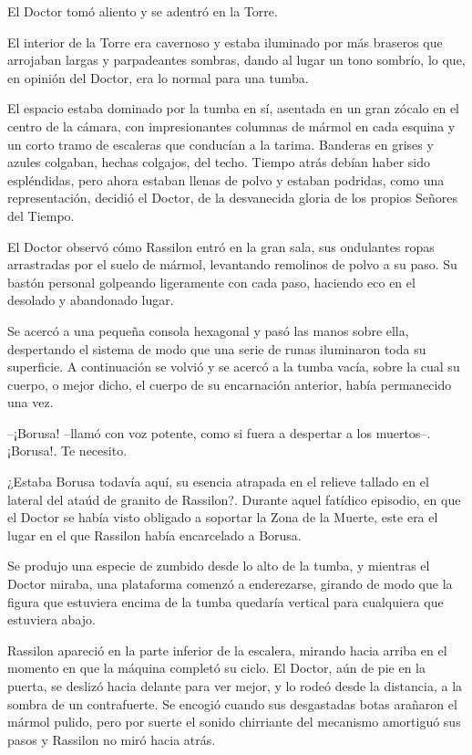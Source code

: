 El Doctor tomó aliento y se adentró en la Torre. 

El interior de la Torre era cavernoso y estaba iluminado por más braseros que arrojaban largas y parpadeantes sombras, dando al lugar un tono sombrío, lo que, en opinión del Doctor, era lo normal para una tumba. 

El espacio estaba dominado por la tumba en sí, asentada en un gran zócalo en el centro de la cámara, con impresionantes columnas de mármol en cada esquina y un corto tramo de escaleras que conducían a la tarima. Banderas en grises y azules colgaban, hechas colgajos, del techo. Tiempo atrás debían haber sido espléndidas, pero ahora estaban llenas de polvo y estaban podridas, como una representación, decidió el Doctor, de la desvanecida gloria de los propios Señores del Tiempo. 

El Doctor observó cómo Rassilon entró en la gran sala, sus ondulantes ropas arrastradas por el suelo de mármol, levantando remolinos de polvo a su paso. Su bastón personal golpeando ligeramente con cada paso, haciendo eco en el desolado y abandonado lugar. 

Se acercó a una pequeña consola hexagonal y pasó las manos sobre ella, despertando el sistema de modo que una serie de runas iluminaron toda su superficie. A continuación se volvió y se acercó a la tumba vacía, sobre la cual su cuerpo, o mejor dicho, el cuerpo de su encarnación anterior, había permanecido una vez. 



--¡Borusa! --llamó con voz potente, como si fuera a despertar a los muertos--. ¡Borusa!. Te necesito.



¿Estaba Borusa todavía aquí, su esencia atrapada en el relieve tallado en el lateral del ataúd de granito de Rassilon?. Durante aquel fatídico episodio, en que el Doctor se había visto obligado a soportar la Zona de la Muerte, este era el lugar en el que Rassilon había encarcelado a Borusa. 

Se produjo una especie de zumbido desde lo alto de la tumba, y mientras el Doctor miraba, una plataforma comenzó a enderezarse, girando de modo que la figura que estuviera encima de la tumba quedaría vertical para cualquiera que estuviera abajo. 

Rassilon apareció en la parte inferior de la escalera, mirando hacia arriba en el momento en que la máquina completó su ciclo. El Doctor, aún de pie en la puerta, se deslizó hacia delante para ver mejor, y lo rodeó desde la distancia, a la sombra de un contrafuerte. Se encogió cuando sus desgastadas botas arañaron el mármol pulido, pero por suerte el sonido chirriante del mecanismo amortiguó sus pasos y Rassilon no miró hacia atrás. 

